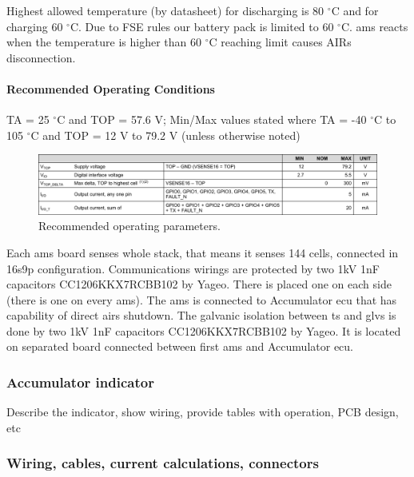 Highest allowed temperature (by datasheet) for discharging is 80 $^\circ$C and for charging 60 $^\circ$C. Due to FSE rules our battery pack is limited to 60 $^\circ$C. \gls{ams} reacts when the temperature is higher than 60 $^\circ$C reaching limit causes AIRs disconnection.

\paragraph{Recommended Operating Conditions}
TA = 25 $^\circ$C and TOP = 57.6 V; Min/Max values stated where TA = -40 $^\circ$C to 105 $^\circ$C and TOP = 12 V to 79.2 V (unless otherwise noted)
\begin{figure}[H]
	\centering
	\includegraphics[width=\textwidth]{./img/BMS-operatingparms.pdf}
	\caption{Recommended operating parameters.}
	\label{fig:BMS-op-params}
\end{figure}


Each \gls{ams} board senses whole stack, that means it senses 144 cells, connected in 16s9p configuration. Communications wirings are protected by two 1kV 1nF capacitors CC1206KKX7RCBB102 by Yageo. There is placed one on each side (there is one on every \gls{ams}). The \gls{ams} is connected to Accumulator \gls{ecu} that has capability of direct \glspl{air} shutdown. The galvanic isolation between \gls{ts} and \gls{glvs} is done by two 1kV 1nF capacitors CC1206KKX7RCBB102 by Yageo. It is located on separated board connected between first \gls{ams} and Accumulator \gls{ecu}.




\subsubsection{Accumulator indicator}
Describe the indicator, show wiring, provide tables with operation, PCB design, etc

\subsubsection{Wiring, cables, current calculations, connectors}

